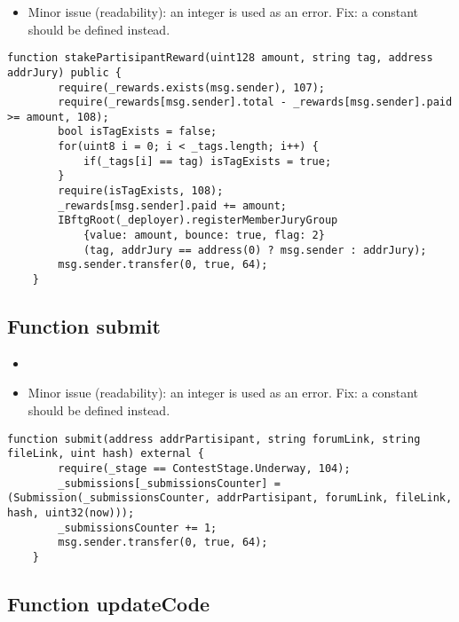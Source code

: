 \begin{itemize}
\item Minor issue (readability): an integer is used as an error. Fix:
  a constant should be defined instead.
\end{itemize}

\begin{lstlisting}[firstnumber=204]
    function stakePartisipantReward(uint128 amount, string tag, address addrJury) public {
        require(_rewards.exists(msg.sender), 107);
        require(_rewards[msg.sender].total - _rewards[msg.sender].paid >= amount, 108);
        bool isTagExists = false;
        for(uint8 i = 0; i < _tags.length; i++) {
            if(_tags[i] == tag) isTagExists = true;
        }
        require(isTagExists, 108);
        _rewards[msg.sender].paid += amount;
        IBftgRoot(_deployer).registerMemberJuryGroup
            {value: amount, bounce: true, flag: 2}
            (tag, addrJury == address(0) ? msg.sender : addrJury);
        msg.sender.transfer(0, true, 64);
    }
\end{lstlisting}

\subsection{Function submit}

\begin{itemize}
\item {}
\item Minor issue (readability): an integer is used as an error. Fix:
  a constant should be defined instead.
\end{itemize}

\begin{lstlisting}[firstnumber=121]
    function submit(address addrPartisipant, string forumLink, string fileLink, uint hash) external {
        require(_stage == ContestStage.Underway, 104);
        _submissions[_submissionsCounter] = (Submission(_submissionsCounter, addrPartisipant, forumLink, fileLink, hash, uint32(now)));
        _submissionsCounter += 1;
        msg.sender.transfer(0, true, 64);
    }
\end{lstlisting}

\subsection{Function updateCode}

